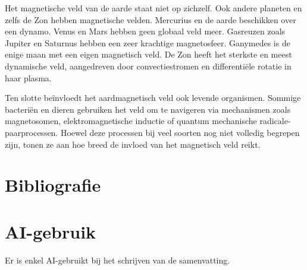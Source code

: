 \documentclass[12pt,a4paper]{article}
\begin{document}
Het magnetische veld van de aarde staat niet op zichzelf. Ook andere planeten en zelfs de Zon hebben magnetische velden. Mercurius en de aarde beschikken over een dynamo. Venus en Mars hebben geen globaal veld meer. Gasreuzen zoals Jupiter en Saturnus hebben een zeer krachtige magnetosfeer. Ganymedes is de enige maan met een eigen magnetisch veld. De Zon heeft het sterkste en meest dynamische veld, aangedreven door convectiestromen en differentiële rotatie in haar plasma.

Ten slotte beïnvloedt het aardmagnetisch veld ook levende organismen. Sommige bacteriën en dieren gebruiken het veld om te navigeren via mechanismen zoals magnetosomen, elektromagnetische inductie of quantum mechanische radicale-paarprocessen. Hoewel deze processen bij veel soorten nog niet volledig begrepen zijn, tonen ze aan hoe breed de invloed van het magnetisch veld reikt.

\section{Bibliografie}

\printbibliography[heading=none]
\section{AI-gebruik}
Er is enkel AI-gebruikt bij het schrijven van de samenvatting.
\end{document}
